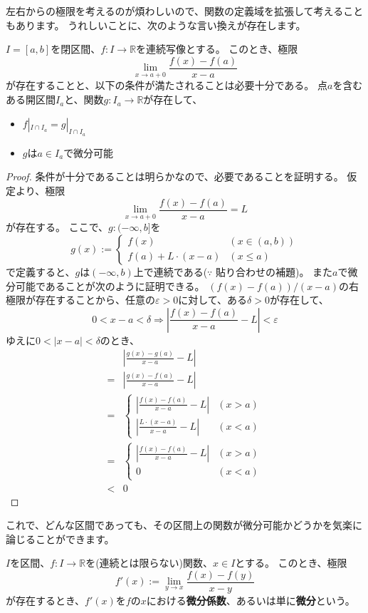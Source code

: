 左右からの極限を考えるのが煩わしいので、関数の定義域を拡張して考えることもあります。
うれしいことに、次のような言い換えが存在します。
\begin{theorem}
  $I=[a,b]$を閉区間、$f:I\to\mathbb{R}$を連続写像とする。
  このとき、極限
  \[
    \lim_{x\to a+0}\frac{f(x)-f(a)}{x-a}
  \]
  が存在することと、以下の条件が満たされることは必要十分である。
  点$a$を含むある開区間$I_a$と、関数$g:I_a\to\mathbb{R}$が存在して、
  \begin{itemize}
    \item $f|_{I\cap I_a}=g|_{I\cap I_a}$
    \item $g$は$a\in I_a$で微分可能
  \end{itemize}
\end{theorem}
\begin{proof}
  条件が十分であることは明らかなので、必要であることを証明する。
  仮定より、極限
  \[
    \lim_{x\to a+0}\frac{f(x)-f(a)}{x-a}=L
  \]
  が存在する。
  ここで、$g:(-\infty,b]$を
  \[
    g(x):=\begin{cases}
      f(x) & (x\in (a,b))\\
      f(a)+L\cdot(x-a) & (x\leq a)
    \end{cases}
  \]
  で定義すると、$g$は$(-\infty,b)$上で連続である($\because$ 貼り合わせの補題)。
  また$a$で微分可能であることが次のように証明できる。
  $(f(x)-f(a))/(x-a)$の右極限が存在することから、任意の$\varepsilon>0$に対して、ある$\delta>0$が存在して、
  \[
    0<x-a<\delta\Rightarrow\left|\frac{f(x)-f(a)}{x-a}-L\right|<\varepsilon
  \]
  ゆえに$0<|x-a|<\delta$のとき、
  \begin{align*}
    &\left|\frac{g(x)-g(a)}{x-a}-L\right|\\
    =&\left|\frac{g(x)-f(a)}{x-a}-L\right|\\
    =&\begin{cases}
      \left|\frac{f(x)-f(a)}{x-a}-L\right| & (x>a)\\
      \left|\frac{L\cdot(x-a)}{x-a}-L\right| & (x<a)
    \end{cases}\\
    =&\begin{cases}
      \left|\frac{f(x)-f(a)}{x-a}-L\right| & (x>a)\\
      0 & (x<a)
    \end{cases}\\
    <&0
  \end{align*}
\end{proof}

これで、どんな区間であっても、その区間上の関数が微分可能かどうかを気楽に論じることができます。
\begin{definition}
  $I$を区間、$f:I\to\mathbb{R}$を(連続とは限らない)関数、$x\in I$とする。
  このとき、極限
  \[
    f'(x):=\lim_{y\to x}\frac{f(x)-f(y)}{x-y}
  \]
  が存在するとき、$f'(x)$を$f$の$x$における\textbf{微分係数}、あるいは単に\textbf{微分}という。
\end{definition}

